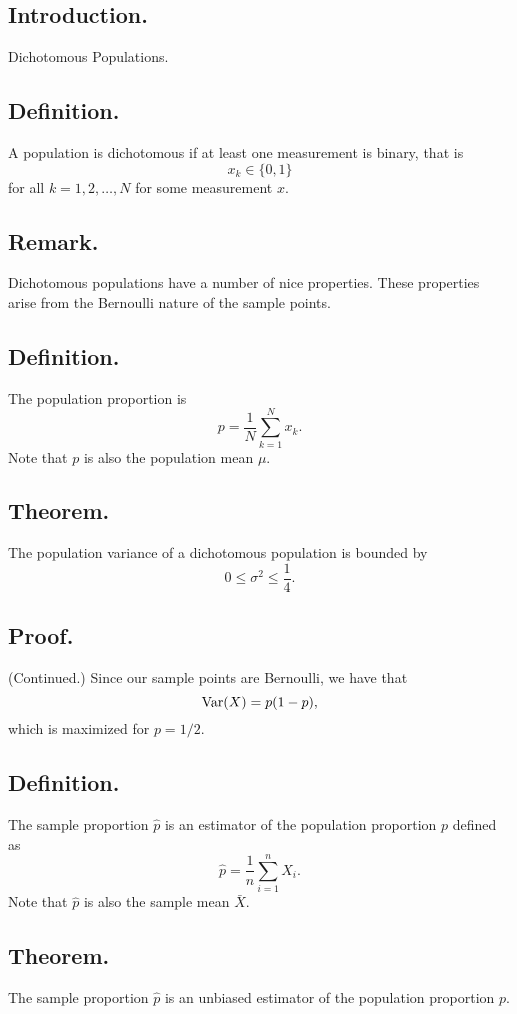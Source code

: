 \documentclass[titlepage]{article}
\begin{document}
\subsection{Introduction.} Dichotomous Populations.

\subsection{Definition.} A population is dichotomous if at least one measurement is binary, that is 
$$x_{k} \in \{0, 1\}$$
for all $k = 1, 2, \ldots, N$ for some measurement $x$.

\subsection{Remark.} Dichotomous populations have a number of nice properties. These properties arise from the Bernoulli nature of the sample points.

\subsection{Definition.} The population proportion is
$$p = \frac{1}{N}\sum_{k=1}^{N}x_{k}.$$
Note that $p$ is also the population mean $\mu$.

\subsection{Theorem.} The population variance of a dichotomous population is bounded by 
$$0 \leq \sigma^{2} \leq \frac{1}{4}.$$

\subsection{Proof.} (Continued.) Since our sample points are Bernoulli, we have that 
$$\text{Var}(X) = p(1-p),$$
which is maximized for $p = 1/2$.

\subsection{Definition.} The sample proportion $\hat{p}$ is an estimator of the population proportion $p$ defined as
$$\hat{p} = \frac{1}{n}\sum_{i=1}^{n}X_{i}.$$
Note that $\hat{p}$ is also the sample mean $\bar{X}$.

\subsection{Theorem.} The sample proportion $\hat{p}$ is an unbiased estimator of the population proportion $p$.
\end{document}

